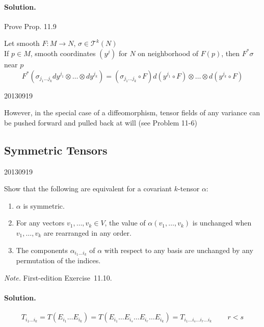\paragraph{Solution.} Prove Prop. 11.9

\begin{corollary}[11.10] Let smooth $F:M \to N$, $\sigma \in \mathcal{T}^k(N)$ \\
If $p\in M$, smooth coordinates $(y^j)$ for $N$ on neighborhood of $F(p)$, then $F^*\sigma$ near $p$ 
\[
F^*(\sigma_{j_1 \dots j_k} dy^{j_1} \otimes \dots \otimes dy^{j_k} ) = (\sigma_{j_1 \dots j_k } \circ F ) d(y^{j_1 } \circ F) \otimes \dots \otimes d(y^{j_k} \circ F)
\]
\end{corollary}


20130919

However, in the special case of a diffeomorphism, tensor fields of any variance can be pushed forward and pulled back at will (see Problem 11-6)

\subsection*{Symmetric Tensors}

20130919

\begin{exercise}
Show that the following are equivalent for a covariant $k$-tensor $\alpha$:
\begin{enumerate}
\item[(a)] $\alpha$ is symmetric.
\item[(b)] For any vectors $v_1,\ldots,v_k\in V$, the value of $\alpha(v_1,\ldots,v_k)$ is unchanged when $v_1,\ldots,v_k$ are rearranged in any order.
\item[(c)] The components $\alpha_{i_1\ldots i_k}$ of $\alpha$ with respect to any basis are unchanged by any permutation of the indices.
\end{enumerate}
\end{exercise}
\noindent\emph{Note.} First-edition Exercise~11.10.
\paragraph{Solution.}

\[
T_{i_1 \dots i_k} = T(E_{i_1} \dots E_{i_k} ) = T(E_{i_1} \dots E_{i_s} \dots E_{i_r} \dots E_{i_k} ) = T_{i_1 \dots i_s \dots i_r \dots i_k } \quad \quad \, r<s
\]




